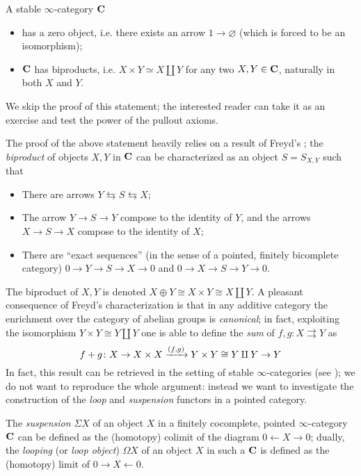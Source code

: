 \begin{remark}
A stable $\infty$\hyp{}category $\mathbf{C}$
\begin{itemize}
\item has a zero object, i.e. there exists an arrow $1\to\varnothing$ (which is forced to be an isomorphism);
\item $\mathbf{C}$ has biproducts, i.e. $X\times Y\simeq X\amalg Y$ for any two $X,Y\in\mathbf{C}$, naturally in both $X$ and $Y$. 
\end{itemize}
\end{remark}
We skip the proof of this statement; the interested reader can take it as an exercise and test the power of the pullout axioms.
\begin{remark}
The proof of the above statement heavily relies on a result of Freyd's \cite{freyd1964abelian}; the \emph{biproduct} of objects $X,Y$ in $\mathbf{C}$ can be characterized as an object $S = S_{X,Y}$ such that
\begin{itemize}
\item There are arrows $Y\leftrightarrows S\leftrightarrows X$;
\item The arrow $Y\to S\to Y$ compose to the identity of $Y$, and the arrows $X\to S\to X$ compose to the identity of $X$;
\item There are ``exact sequences'' (in the sense of a pointed, finitely bicomplete category) $0\to Y\to S\to X\to 0$ and $0\to X\to S\to Y\to 0$.
\end{itemize}
The biproduct of $X,Y$ is denoted $X\oplus Y\cong X\times Y\cong X\amalg Y$. A pleasant consequence of Freyd's characterization is that in any additive category the enrichment over the category of abelian groups is \emph{canonical}; in fact, exploiting the isomorphism $Y\times Y\cong Y\amalg Y$ one is able to define the \emph{sum} of $f,g\colon X\rightrightarrows Y$ as
\[
f+g\colon X\to X\times X \xrightarrow{(f,g)} Y\times Y\cong Y\amalg Y\to Y
\]
In fact, this result can be retrieved in the setting of stable $\infty$\hyp{}categories (see \cite[Lemma \textbf{1.1.2.9}]{LurieHA}); we do not want to reproduce the whole argument: instead we want to investigate the construction of the \emph{loop} and \emph{suspension} functors in a pointed category.
\end{remark}
The \emph{suspension} $\Sigma X$ of an object $X$ in a finitely cocomplete, pointed $\infty$\hyp{}category $\mathbf{C}$ can be defined as the (homotopy) colimit of the diagram $0\leftarrow X\to 0$; dually, the \emph{looping} (or \emph{loop object}) $\Omega X$ of an object $X$ in such a $\mathbf{C}$ is defined as the (homotopy) limit of $0\to X\leftarrow 0$. 

